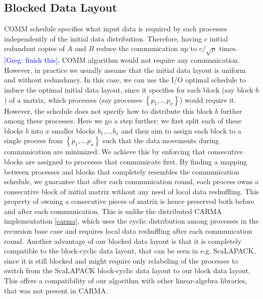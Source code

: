 \documentclass[sigplan,review,anonymous,10pt]{acmart}\settopmatter{printfolios=true,printccs=false,printacmref=false}
\newcommand\greg[1]{\textcolor{blue}{[Greg: #1]}}
\begin{document}
\subsection{Blocked Data Layout}
\label{sec:datalayout}
COMM schedule specifies what input data is required by each processes
independently of the initial data distribution. 
Therefore, having $c$ initial redundant copies of $A$ and $B$ reduce the 
communication up to $c/\sqrt{p}$ times. \greg{finish this}, COMM 
algorithm would not require any communication. However, in practice we usually 
assume that the initial data layout is uniform and without redundancy. In this 
case, we can use the I/O optimal schedule to induce the optimal initial data 
layout, since it specifies for each block (say block $b$) of a matrix, which 
processes (say processes $\left\{ p_1, ... p_x\right\}$) would require it. 
However, the schedule does not specify how to distribute this block $b$ further 
among these processes. Here we go a step further: we first split each of these 
blocks $b$ into $x$ smaller blocks $b_1, ... b_x$ and then aim to assign each 
block to a single process from $\left\{ p_1, ... p_x\right\}$ such that the 
data movements during communication are minimized. We achieve this by enforcing 
that consecutive blocks are assigned to processes that communicate first. By 
finding a mapping between processes and blocks that completely resembles the 
communication schedule, we guarantee that after each communication round, each 
process owns a consecutive block of initial matrix without any need of local 
data reshuffling. This property of owning a consecutive pieces of matrix is 
hence preserved both before and after each communication. This is unlike the 
distributed CARMA implementation \ref{carma}, which uses the cyclic 
distribution among processes in the recursion base case and requires local data 
reshuffling after each communication round. Another advantage of our blocked 
data layout is that it is completely compatible to the block-cyclic data 
layout, that can be seen in e.g. ScaLAPACK, since it is still blocked and might 
require only relabeling of the processes to switch from the ScaLAPACK 
block-cyclic data layout to our block data layout. This offers a compatibility 
of our algorithm with other linear-algebra libraries, that was not present in 
CARMA.
\end{document}
